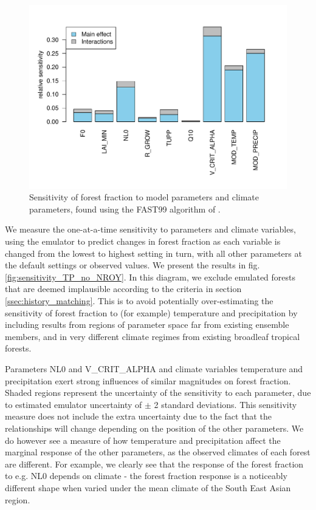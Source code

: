 \documentclass[gmd, manuscript]{copernicus}
\begin{document}
\begin{figure}[t]
\includegraphics[width=12cm]{../graphics/fast_barplot.pdf}
\caption{Sensitivity of forest fraction to model parameters and climate parameters, found using the FAST99 algorithm of \cite{saltelli1999sensitivity}.
}
\label{fig:fast_barplot}
\end{figure}


We measure the one-at-a-time sensitivity to parameters and climate variables, using the emulator to predict changes in forest fraction as each variable is changed from the lowest to highest setting in turn, with all other parameters at the default settings or observed values. We present the results in fig. \ref{fig:sensitivity_TP_no_NROY}. In this diagram, we exclude emulated forests that are deemed implausible according to the criteria in section \ref{ssec:history_matching}. This is to avoid potentially over-estimating the sensitivity of forest fraction to (for example) temperature and precipitation by including results from regions of parameter space far from existing ensemble members, and in very different climate regimes from existing broadleaf tropical forests. 

 Parameters NL0 and V\_CRIT\_ALPHA and climate variables temperature and precipitation exert strong influences of similar magnitudes on forest fraction. Shaded regions represent the uncertainty of the sensitivity to each parameter, due to estimated emulator uncertainty of $\pm$ 2 standard deviations. This sensitivity measure does not include the extra uncertainty due to the fact that the relationships will change depending on the position of the other parameters. We do however see a measure of how temperature and precipitation affect the marginal response of the other parameters, as the observed climates of each forest are different. For example, we clearly see that the response of the forest fraction to e.g. NL0 depends on climate - the forest fraction response is a noticeably different shape when varied under the mean climate of the South East Asian region.
\end{document}
